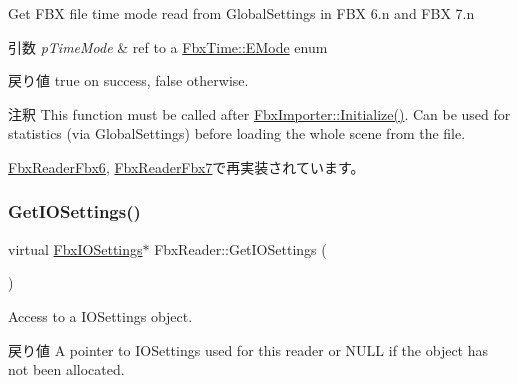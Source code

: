 Get F\+BX file time mode read from Global\+Settings in F\+BX 6.\+n and F\+BX 7.\+n 
\begin{DoxyParams}{引数}
{\em p\+Time\+Mode} & ref to a \hyperlink{class_fbx_time_acc529b00a0e8d4c3da3702449ca93031}{Fbx\+Time\+::\+E\+Mode} enum \\
\hline
\end{DoxyParams}
\begin{DoxyReturn}{戻り値}
{\ttfamily true} on success, {\ttfamily false} otherwise. 
\end{DoxyReturn}
\begin{DoxyRemark}{注釈}
This function must be called after \hyperlink{class_fbx_importer_a70528a9ca1ff737bda9696a2073acd13}{Fbx\+Importer\+::\+Initialize()}. Can be used for statistics (via Global\+Settings) before loading the whole scene from the file. 
\end{DoxyRemark}


\hyperlink{class_fbx_reader_fbx6_ad4ae4c4949d316491f937a0ff75c6ed7}{Fbx\+Reader\+Fbx6}, \hyperlink{class_fbx_reader_fbx7_a4aac7f6892348dd1f8fe5129cbfc2cc1}{Fbx\+Reader\+Fbx7}で再実装されています。

\mbox{\label{class_fbx_reader_a27bef92675a5f95f18dfe105a0c06d8b}} 
\subsubsection{\texorpdfstring{Get\+I\+O\+Settings()}{GetIOSettings()}}
{\footnotesize\ttfamily virtual \hyperlink{class_fbx_i_o_settings}{Fbx\+I\+O\+Settings}$\ast$ Fbx\+Reader\+::\+Get\+I\+O\+Settings (\begin{DoxyParamCaption}{ }\end{DoxyParamCaption})\hspace{0.3cm}{\ttfamily [virtual]}}

Access to a I\+O\+Settings object. \begin{DoxyReturn}{戻り値}
A pointer to I\+O\+Settings used for this reader or N\+U\+LL if the object has not been allocated. 
\end{DoxyReturn}
\mbox{\label{class_fbx_reader_acea3c118db490378c9aed17512396932}} 
